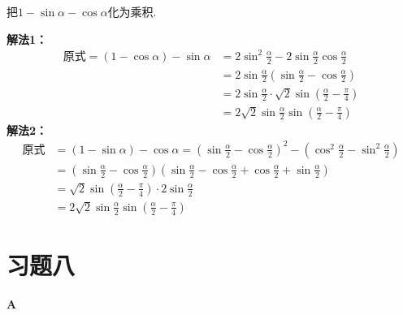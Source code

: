 \begin{example}
把$1-\sin\alpha-\cos\alpha$化为乘积.
\end{example}

\begin{solution}
\textbf{解法1：}
\[\begin{split}
    \text{原式}=(1-\cos\alpha)-\sin\alpha &=2\sin^2\frac{\alpha}{2}-2\sin\frac{\alpha}{2}\cos\frac{\alpha}{2}\\
    &=2\sin\frac{\alpha}{2}\left(\sin\frac{\alpha}{2}-\cos\frac{\alpha}{2}\right)\\
    &=2\sin\frac{\alpha}{2}\cdot \sqrt{2}\sin\left(\frac{\alpha}{2}-\frac{\pi}{4}\right)\\
    &=2\sqrt{2}\sin\frac{\alpha}{2}\sin\left(\frac{\alpha}{2}-\frac{\pi}{4}\right)
\end{split}\]
\textbf{解法2：}
\[\begin{split}
    \text{原式}&=(1-\sin\alpha)-\cos\alpha=\left(\sin\frac{\alpha}{2}-\cos\frac{\alpha}{2}\right)^2-\left(\cos^2\frac{\alpha}{2}-\sin^2\frac{\alpha}{2}\right)\\
    &=\left(\sin\frac{\alpha}{2}-\cos\frac{\alpha}{2}\right)\left(\sin\frac{\alpha}{2}-\cos\frac{\alpha}{2}+\cos\frac{\alpha}{2}+\sin\frac{\alpha}{2}\right)\\
    &=\sqrt{2}\sin\left(\frac{\alpha}{2}-\frac{\pi}{4}\right)\cdot 2\sin\frac{\alpha}{2}\\
    &=2\sqrt{2}\sin\frac{\alpha}{2}\sin\left(\frac{\alpha}{2}-\frac{\pi}{4}\right)
\end{split}\]
\end{solution}

\section*{习题八}
\begin{center}
    \bfseries A
\end{center}

